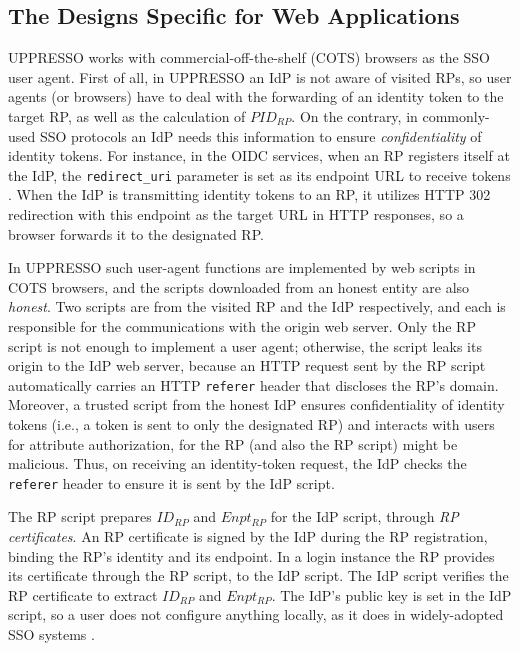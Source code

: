 \subsection{The Designs Specific for Web Applications}
\label{sec:web-design}
UPPRESSO works with commercial-off-the-shelf (COTS) browsers as the SSO user agent.
First of all, in UPPRESSO an IdP is not aware of visited RPs,
 so user agents (or browsers) have to deal with the forwarding of an identity token
    to the target RP, as well as the calculation of $PID_{RP}$.
On the contrary,
    in commonly-used SSO protocols \cite{OpenIDConnect,rfc6749,SAML,SAMLIdentifier} an IdP needs this information to ensure \emph{confidentiality} of identity tokens.
For instance, in the OIDC services, when an RP registers itself at the IdP, the \verb+redirect_uri+ parameter
    is set as its endpoint URL to receive tokens  \cite{OpenIDConnect}.
When the IdP is transmitting identity tokens to an RP,
    it utilizes HTTP 302 redirection with this endpoint as the target URL in HTTP responses,
     so a browser forwards it to the designated RP.

In UPPRESSO such user-agent functions are implemented by web scripts in COTS browsers,
and the scripts downloaded from an honest entity are also \emph{honest}.
Two scripts are from the visited RP and the IdP respectively,
    and each is responsible for the communications with the origin web server.
Only the RP script is not enough to implement a user agent;
    otherwise, the script leaks its origin to the IdP web server,
    because
    an HTTP request sent by the RP script
automatically carries an HTTP \verb+referer+ header that discloses the RP's domain.
Moreover, a trusted script from the honest IdP
ensures confidentiality of identity tokens (i.e., a token is sent to only the designated RP)
and interacts with users for attribute authorization,
    for the RP (and also the RP script) might be malicious.
Thus, on receiving an identity-token request,
    the IdP checks the \verb+referer+ header to ensure it is sent by the IdP script.

The RP script prepares $ID_{RP}$ and $Enpt_{RP}$ for the IdP script, through \emph{RP certificates}.
An RP certificate is signed by the IdP during the RP registration,
     binding the RP's identity and its endpoint. %
In a login instance
    the RP provides its certificate through the RP script, to the IdP script.
The IdP script %
    verifies the RP certificate to extract $ID_{RP}$ and $Enpt_{RP}$.
The IdP's public key is set in the IdP script, so
 a user does not configure anything locally,
    as it does in widely-adopted SSO systems \cite{OpenIDConnect, rfc6749, SAML,SAMLIdentifier}.


